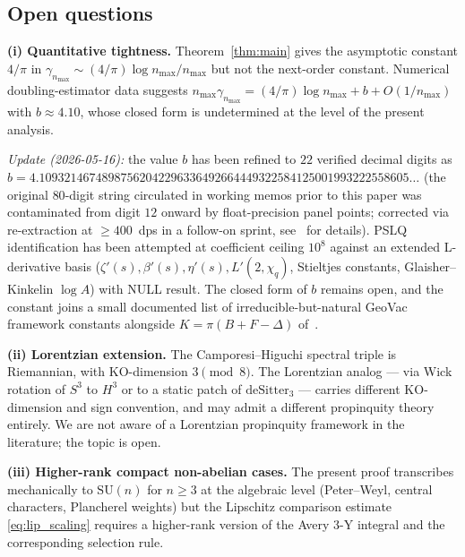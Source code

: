 \documentclass[11pt,a4paper]{article}
\theoremstyle{plain}
\theoremstyle{definition}
\newcommand{\nmax}{n_{\max}}
\newcommand{\sthree}{S^{3}}
\newcommand{\SU}{\mathrm{SU}}
\begin{document}
\subsection{Open questions}\label{sec:open}

\textbf{(i) Quantitative tightness.} Theorem~\ref{thm:main} gives the
asymptotic constant $4/\pi$ in $\gamma_{\nmax} \sim
(4/\pi) \log \nmax / \nmax$ but not the next-order constant.
Numerical doubling-estimator data suggests
$\nmax \gamma_{\nmax} = (4/\pi) \log \nmax + b + O(1/\nmax)$ with
$b \approx 4.10$, whose closed form is undetermined at the level of
the present analysis.

\emph{Update (2026-05-16):} the value $b$ has been refined to $22$
verified decimal digits as
$b = 4.10932146748987562042296336492664449322584125001993222558605\ldots$
(the original $80$-digit string circulated in working memos prior to
this paper was contaminated from digit $12$ onward by float-precision
panel points; corrected via re-extraction at $\ge 400$~dps in a
follow-on sprint, see~\cite{paper40_unified} for details). PSLQ
identification has been attempted at coefficient ceiling $10^8$
against an extended L-derivative basis ($\zeta'(s), \beta'(s),
\eta'(s), L'(2, \chi_q)$, Stieltjes constants, Glaisher--Kinkelin
$\log A$) with NULL result. The closed form of $b$ remains open, and
the constant joins a small documented list of irreducible-but-natural
GeoVac framework constants alongside $K = \pi(B+F-\Delta)$
of~\cite{paper2}.

\textbf{(ii) Lorentzian extension.} The Camporesi--Higuchi spectral
triple is Riemannian, with KO-dimension $3 \pmod 8$. The Lorentzian
analog --- via Wick rotation of $\sthree$ to $H^3$ or to a static
patch of $\mathrm{de Sitter}_3$ --- carries different KO-dimension and
sign convention, and may admit a different propinquity theory entirely.
We are not aware of a Lorentzian propinquity framework in the
literature; the topic is open.

\textbf{(iii) Higher-rank compact non-abelian cases.} The present
proof transcribes mechanically to $\SU(n)$ for $n \ge 3$ at the
algebraic level (Peter--Weyl, central characters, Plancherel weights)
but the Lipschitz comparison estimate
\eqref{eq:lip_scaling} requires a higher-rank version of the
Avery 3-Y integral and the corresponding selection rule.
\end{document}
